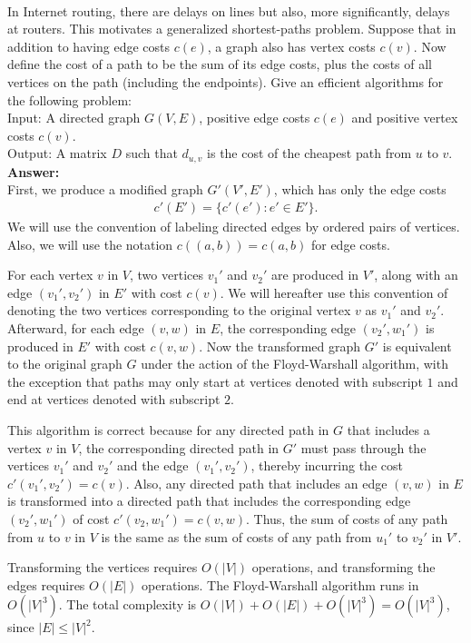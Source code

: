 \documentclass[a4paper,11pt]{article}
\begin{document}
\\
In Internet routing, there are delays on lines but also, more
significantly, delays at routers. This motivates a generalized shortest-paths problem.
Suppose that in addition to having edge costs $c(e)$, a graph also has vertex costs $c(v)$.
Now define the cost of a path to be the sum of its edge costs, plus the costs of
all vertices on the path (including the endpoints). Give an efficient algorithms for the following problem:\\
Input: A directed graph $G(V,E)$, positive edge costs $c(e)$ and positive vertex costs $c(v)$.\\
Output: A matrix $D$ such that $d_{u,v}$ is the cost of the cheapest path from $u$ to $v$.\\
{\bf Answer:}\\
First, we produce a modified graph $G'(V', E')$, which has only the edge costs
\begin{align*}
    c'(E') = \{ c'(e') : e' \in E' \}.
\end{align*}
We will use the convention of labeling directed edges by ordered pairs of vertices. Also, we will use the notation $c((a, b)) = c(a, b)$ for edge costs. \par
For each vertex $v$ in $V$, two vertices $v_1'$ and $v_2'$ are produced in $V'$, along with an edge $(v_1', v_2')$ in $E'$ with cost $c(v)$. We will hereafter use this convention of denoting the two vertices corresponding to the original vertex $v$ as $v_1'$ and $v_2'$. Afterward, for each edge $(v, w)$ in $E$, the corresponding edge $(v_2', w_1')$ is produced in $E'$ with cost $c(v, w)$. Now the transformed graph $G'$ is equivalent to the original graph $G$ under the action of the Floyd-Warshall algorithm, with the exception that paths may only start at vertices denoted with subscript $1$ and end at vertices denoted with subscript $2$. \par
This algorithm is correct because for any directed path in $G$ that includes a vertex $v$ in $V$, the corresponding directed path in $G'$ must pass through the vertices $v_1'$ and $v_2'$ and the edge $(v_1', v_2')$, thereby incurring the cost $c'(v_1', v_2') = c(v)$. Also, any directed path that includes an edge $(v, w)$ in $E$ is transformed into a directed path that includes the corresponding edge $(v_2', w_1')$ of cost $c'(v_2, w_1') = c(v, w)$. Thus, the sum of costs of any path from $u$ to $v$ in $V$ is the same as the sum of costs of any path from $u_1'$ to $v_2'$ in $V'$. \par
Transforming the vertices requires $O(|V|)$ operations, and transforming the edges requires $O(|E|)$ operations. The Floyd-Warshall algorithm runs in $O(|V|^3)$. The total complexity is $O(|V|) + O(|E|) + O(|V|^3) = O(|V|^3)$, since $|E| \leq |V|^2$.
\end{document}
